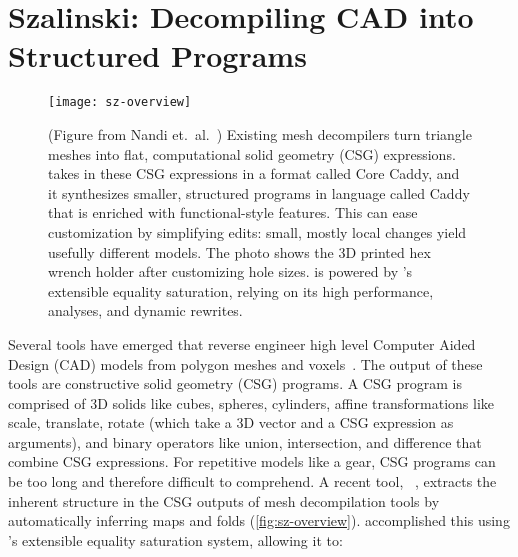 \section{Szalinski: Decompiling CAD into Structured Programs}
\label{sec:szalinski}

\begin{figure}
  \centering
  \texttt{[image: sz-overview]}
  \caption[Szalinski decompiles flat CSG into structured CAD]{
  (Figure from Nandi et.\ al.\ \cite{szalinski})
  Existing mesh decompilers turn
    triangle meshes into flat, computational solid geometry (CSG) expressions.
  \sz~\cite{szalinski} takes in these CSG expressions
    in a format called Core Caddy,
    and it synthesizes smaller, structured programs in language called Caddy
    that is enriched with functional-style features.
  This can ease customization by simplifying edits:
    small, mostly local changes
    yield usefully different models.
  The photo shows the 3D printed hex wrench holder after
    customizing hole sizes.
  \sz is powered by \egg's extensible equality saturation, relying on its high
    performance, \eclass analyses, and dynamic rewrites.
  }
  \label{fig:sz-overview}
\end{figure}

Several tools have emerged
  that reverse engineer high level
  Computer Aided Design (CAD) models from polygon
  meshes and voxels~\cite{reincarnate, inverse, shape, csgnet, latex}.
The output of these tools are constructive solid geometry (CSG) programs.
A CSG program is comprised of
  3D solids like cubes, spheres, cylinders,
  affine transformations like scale, translate, rotate
  (which take a 3D vector and a CSG expression as arguments),
  and binary operators like union, intersection, and difference
  that combine CSG expressions.
For repetitive models like a gear, CSG programs can be too long
  and therefore difficult to comprehend.
A recent tool, \sz~\cite{szalinski},
  extracts the inherent structure
  in the CSG outputs of mesh decompilation tools
  by automatically inferring maps and folds (\autoref{fig:sz-overview}).
\sz accomplished this using \egg's extensible equality saturation system,
  allowing it to:

